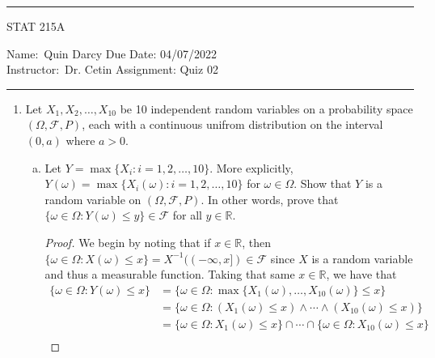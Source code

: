 \documentclass[12pt]{article}
\begin{document}
    \thispagestyle{empty}\hrule

    \begin{center}
        \vspace{.4cm} { \large STAT 215A}
    \end{center}
    {Name:\ Quin Darcy \hspace{\fill} Due Date: 04/07/2022   \\
    { Instructor:}\ Dr. Cetin \hspace{\fill} Assignment:
    Quiz 02 \\ \hrule}

    \begin{enumerate}
        \item Let $X_1, X_2, \dots, X_{10}$ be 10 independent random variables
            on a probability space $(\Omega, \mathcal{F}, P)$, each with
            a continuous unifrom distribution on the interval $(0, a)$ where
            $a>0$. 
            \begin{enumerate}[(a)]
                \item Let $Y=\max\{X_i:i=1, 2, \dots, 10\}$. More explicitly,
                    $Y(\omega)=\max\{X_i(\omega):i=1, 2, \dots, 10\}$ for
                    $\omega\in\Omega$. Show that $Y$ is a random variable on
                    $(\Omega, \mathcal{F}, P)$. In other words, prove that
                    $\{\omega\in\Omega:Y(\omega)\leq y\}\in\mathcal{F}$ for all
                    $y\in\mathbb{R}$. 
                    \begin{proof}
                        We begin by noting that if $x\in\mathbb{R}$, then
                        $\{\omega\in\Omega:X(\omega)\leq x\}=X^{-1}((-\infty,
                        x])\in\mathcal{F}$ since $X$ is a random variable and
                        thus a measurable function. Taking that same
                        $x\in\mathbb{R}$, we have that 
                        \begin{align*}
                            \{\omega\in\Omega:Y(\omega)\leq x\}
                            &=\{\omega\in\Omega:\max\{X_1(\omega), \dots,
                            X_{10}(\omega)\} \leq x\} \\ 
                            &=\{\omega\in\Omega:(X_1(\omega)\leq
                            x)\land\cdots\land(X_{10}(\omega)\leq x)\} \\
                            &=\{\omega\in\Omega:X_1(\omega)\leq
                            x\}\cap\cdots\cap\{\omega\in\Omega:X_{10}(\omega)\leq
                            x\} \\

\end{align*}
\end{proof}
\end{enumerate}
\end{enumerate}
\end{document}
